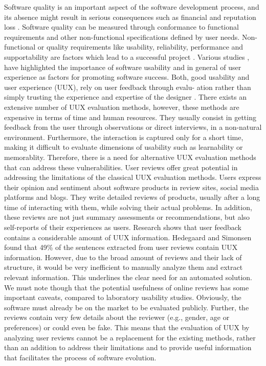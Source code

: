 Software quality is an important aspect of the software development process, and its absence might result in serious consequences such as financial and reputation loss \cite{Hussain2013}.
Software quality can be measured through conformance to functional requirements and other non-functional specifications defined by user needs\cite{Chattopadhyay2013}. Non-functional or quality requirements like usability, reliability, performance and supportability are factors which lead to a successful project \cite{Bayraktaroglu2009}. Various studies \cite{Lizano2013}, \cite{ Chattopadhyay2013} have highlighted the importance of software usability and in general of user experience as factors for promoting software success. 
Both, good usability and user experience (UUX), rely on user feedback through evalu- ation rather than simply trusting the experience and expertise of the designer \cite{Quesenbery2001}.
There exists an extensive number of UUX evaluation methods, however, these methods are expensive in terms of time and human resources.  They usually consist in getting feedback from the user through observations or direct interviews, in a non-natural environment. Furthermore, the interaction is captured only for a short time, making it difficult to evaluate dimensions of usability such as learnability or memorablity. Therefore, there is a need for alternative UUX evaluation methods that can address these vulnerabilities. 
User reviews offer great potential in addressing the limitations of the classical UUX evaluation methods. Users express their opinion and sentiment about software products in review sites, social media platforms and blogs. They write detailed reviews of products, usually after a long time of interacting with them, while solving their actual problems. In addition, these reviews are not just summary assessments or recommendations, but also self-reports of their experiences as users. Research shows that user feedback contains a considerable amount of UUX information. Hedegaard and Simonsen \cite{Hedegaard2013} found that 49\% of the sentences extracted from user reviews contain UUX information. However, due to the broad amount of reviews and their lack of  structure, it would be very inefficient to manually analyze them and extract relevant information. This underlines the clear need for an automated solution.
We must note though that the potential usefulness of online reviews has some important caveats, compared to laboratory usability studies. 
Obviously, the software must already be on the market to be evaluated publicly.
Further, the reviews contain very few details about the reviewer (e.g., gender, age or preferences) or could even be fake.
This means that the evaluation of UUX by analyzing user reviews cannot be a replacement for the existing methods, rather than an addition to address their limitations and to provide useful information that facilitates the process of software evolution.